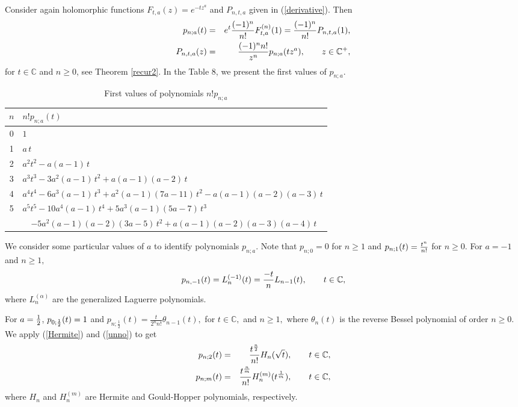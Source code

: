 \documentclass[a4paper,12pt]{amsart}
\def\CC{\mathbb C}
\def\CC{\mathbb C}
\theoremstyle{definition}
\theoremstyle{remark}
\begin{document}
 Consider again holomorphic functions $F_{t,a}(z)= e^{-tz^a}$ and $P_{n,t,a}$ given in (\ref{derivative}). Then
\begin{eqnarray}\label{unno}
    p_{n;a}(t)&=&e^{t}{(-1)^n\over n!}F^{(n)}_{t,a}(1)= {(-1)^n\over n!}P_{n,t,a}(1),\\
    P_{n,t,a}(z)&= &{(-1)^n n!\over z^n}p_{n;a}(tz^a), \qquad z\in \CC^+,\label{twoo}
\end{eqnarray}
for $t\in \CC$ and $n\ge 0$, see Theorem \ref{recur2}.
In the Table 8,  we present the first values of $p_{n;a}$.

\begin{table}[h] \label{pn}
\centering
\small
\begin{tabular}{c|l}
$n$ & $n!p_{n;a}(t)$ \\ \hline
0 &
$1$
\\
1 &
$ a\, t$
\\
2 &
$a^2 t^2 - a(a-1)\, t$
\\
3 &
$ a^3 t^3
- 3a^2(a-1)\, t^2
+ a(a-1)(a-2)\, t$
\\
4 &
$a^4 t^4
- 6a^3(a-1)\, t^3
+ a^2(a-1)(7a-11)\, t^2
- a(a-1)(a-2)(a-3)\, t$
\\
5 &
$a^5 t^5
- 10a^4(a-1)\, t^4
+ 5a^3(a-1)(5a-7)\, t^3$ \\
&
$\quad
{- 5a^2(a-1)(a-2)(3a-5)\, t^2}
+a(a-1)(a-2)(a-3)(a-4)\, t$ \\

\end{tabular}
\vspace{2pt}
\caption{{First values of polynomials $n!p_{n;a}$}}
\end{table}

\smallskip
{} We consider some particular values of $a$ to identify polynomials $p_{n;a}$. Note that $p_{n;0}=0$ for $n\ge 1$ and $p_{n;1}{(t)}={t^n\over n!}$ for $n\ge 0$. For $a=-1$ and $n\ge 1,$
$$
p_{n,-1}(t)=L_n^{(-1)}(t)={-t\over n}L_{n-1}(t), \qquad t\in \CC,
$$
where $L_n^{(\alpha)}$ are the generalized Laguerre polynomials.

For $a={1\over 2}$, $p_{0;{1\over 2}}(t)=1$ and
$
{p_{n;\frac{1}{2}}(t)=\displaystyle\frac{t}{2^n n!}\theta_{n-1}(t),}$ for $t\in \CC,$ and $n\ge 1,$
where  $\theta_{n}(t)$ is the reverse Bessel polynomial of order $n\ge 0$. We apply  (\ref{Hermite}) and (\ref{unno}) to get
\begin{eqnarray*}
p_{n;2}(t)&=&{{t}^{n\over 2}\over n!}H_n(\sqrt{t}),\qquad t\in \CC,\\
p_{n;m}(t)&=&{{t}^{n\over m}\over n!}H_n^{(m)}(t^{1\over m}),\qquad t\in \CC,
\end{eqnarray*}
where $H_n$ and $H_n^{(m)}$ are Hermite and Gould-Hopper polynomials, respectively.
\end{document}
